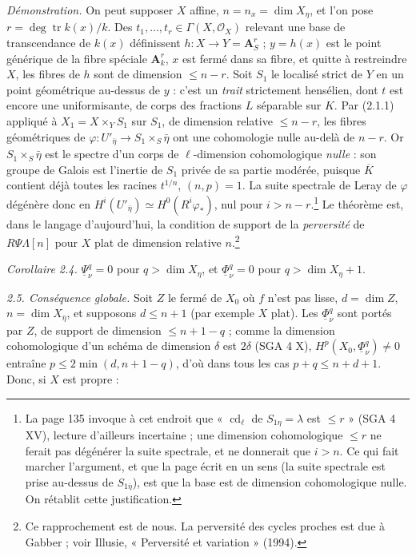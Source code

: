 \documentclass[11pt,a4paper]{article}
\begin{document}
\emph{Démonstration.} On peut supposer $X$ affine, $n = n_x = \dim X_\eta$, et
l'on pose $r = \deg\operatorname{tr} k(x)/k$. Des $t_1, \ldots, t_r \in
\Gamma(X, \mathcal{O}_X)$ relevant une base de transcendance de $k(x)$
définissent $h : X \to Y = \mathbf{A}^r_S$ ; $y = h(x)$ est le point générique
de la fibre spéciale $\mathbf{A}^r_k$, $x$ est fermé dans sa fibre, et quitte à
restreindre $X$, les fibres de $h$ sont de dimension $\leq n - r$. Soit $S_1$ le
localisé strict de $Y$ en un point géométrique au-dessus de $y$ : c'est un
\emph{trait} strictement hensélien, dont $t$ est encore une uniformisante, de
corps des fractions $L$ séparable sur $K$. Par (2.1.1) appliqué à $X_1 = X
\times_Y S_1$ sur $S_1$, de dimension relative $\leq n - r$, les fibres
géométriques de $\varphi : U'_{\bar\eta} \to S_1 \times_S \bar\eta$ ont une
cohomologie nulle au-delà de $n - r$. Or $S_1 \times_S \bar\eta$ est le spectre
d'un corps de $\ell$-dimension cohomologique \emph{nulle} : son groupe de Galois
est l'inertie de $S_1$ privée de sa partie modérée, puisque $\overline K$
contient déjà toutes les racines $t^{1/n}$, $(n,p) = 1$. La suite spectrale de
Leray de $\varphi$ dégénère donc en $H^i(U'_{\bar\eta}) \simeq
H^0(R^i\varphi_*)$, nul pour $i > n - r$.\footnote{La page 135 invoque à cet
endroit que « $\operatorname{cd}_\ell$ de $S_{1\eta} = \lambda$ est $\leq r$ »
(SGA 4 XV), lecture d'ailleurs incertaine ; une dimension cohomologique $\leq r$
ne ferait pas dégénérer la suite spectrale, et ne donnerait que $i > n$. Ce qui
fait marcher l'argument, et que la page écrit en un sens (la suite spectrale
est prise au-dessus de $S_{1\bar\eta}$), est que la base est de dimension
cohomologique nulle. On rétablit cette justification.} Le théorème est, dans le
langage d'aujourd'hui, la condition de support de la \emph{perversité} de
$R\Psi\Lambda[n]$ pour $X$ plat de dimension relative $n$.\footnote{Ce
rapprochement est de nous. La perversité des cycles proches est due à Gabber ;
voir Illusie, « Perversité et variation » (1994).}

\emph{Corollaire 2.4.} $\underline\Psi^q_\nu = 0$ pour $q > \dim X_\eta$, et
$\underline\Phi^q_\nu = 0$ pour $q > \dim X_\eta + 1$.

\emph{2.5. Conséquence globale.} Soit $Z$ le fermé de $X_0$ où $f$ n'est pas
lisse, $d = \dim Z$, $n = \dim X_{\bar\eta}$, et supposons $d \leq n + 1$ (par
exemple $X$ plat). Les $\underline\Phi^q_\nu$ sont portés par $Z$, de support de
dimension $\leq n + 1 - q$ ; comme la dimension cohomologique d'un schéma de
dimension $\delta$ est $2\delta$ (SGA 4 X), $H^p(X_0, \underline\Phi^q_\nu) \neq 0$
entraîne $p \leq 2\min(d, n+1-q)$, d'où dans tous les cas
$p + q \leq n + d + 1$. Donc, si $X$ est propre :
\end{document}
